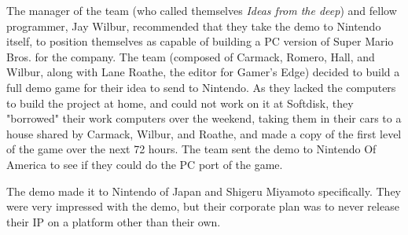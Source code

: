 \documentclass[book.tex]{subfiles}
\begin{document}
\par
The manager of the team (who called themselves \textit{Ideas from the deep}) and fellow programmer, Jay Wilbur, recommended that they take the demo to Nintendo itself, to position themselves as capable of building a PC version of Super Mario Bros. for the company. The team (composed of Carmack, Romero, Hall, and Wilbur, along with Lane Roathe, the editor for Gamer's Edge) decided to build a full demo game for their idea to send to Nintendo. As they lacked the computers to build the project at home, and could not work on it at Softdisk, they "borrowed" their work computers over the weekend, taking them in their cars to a house shared by Carmack, Wilbur, and Roathe, and made a copy of the first level of the game over the next 72 hours. The team sent the demo to Nintendo Of America to see if they could do the PC port of the game. \\

\par
The demo made it to Nintendo of Japan and Shigeru Miyamoto specifically. They were very impressed with the demo, but their corporate plan was to never release their IP on a platform other than their own.
\end{document}
